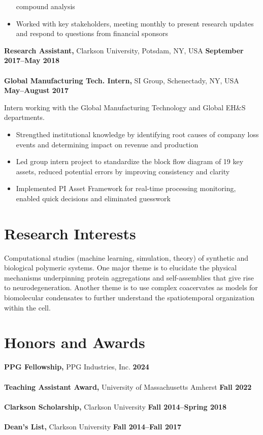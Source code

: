 \documentclass[margin,line]{res}
\begin{document}
\begin{resume}
\begin{adjustwidth}{1.5em}{0pt}
\begin{itemize}
			      compound analysis
			\item Worked with key stakeholders, meeting monthly to present
			      research updates and respond to questions from financial sponsors
		\end{itemize}
	\end{adjustwidth}
	{\bf Research Assistant,} Clarkson University, Potsdam, NY, USA
	\hfill {\bf September 2017--May 2018}\\
	\\
	{\bf Global Manufacturing Tech. Intern,} SI Group, Schenectady, NY, USA
	\hfill {\bf  May--August 2017}\\
	\begin{adjustwidth}{1.5em}{0pt}
		Intern working with the Global Manufacturing Technology and Global EH\&S
		departments.
		\begin{itemize}
			\item Strengthed institutional knowledge by identifying root causes of
			      company loss events and determining impact on revenue and production
			\item Led group intern project to standardize the block flow diagram of
			      19 key assets, reduced potential errors by improving consistency and
			      clarity
			\item Implemented PI Asset Framework for real-time processing monitoring,
			      enabled quick decisions and eliminated guesswork
		\end{itemize}
	\end{adjustwidth}
	\vspace{-1em}

	\section{\sc Research Interests}
	Computational studies (machine learning, simulation, theory) of synthetic and
	biological polymeric systems. One major theme is to elucidate the physical
	mechanisms underpinning protein aggregations and self-assemblies that give
	rise to neurodegeneration. Another theme is to use complex coacervates as
	models for biomolecular condensates to further understand the spatiotemporal
	organization within the cell.

	\section{\sc Honors and Awards}
	 {\bf PPG Fellowship,} PPG Industries, Inc. \hfill {\bf 2024}\\
	\\
	{\bf Teaching Assistant Award,} University of Massachusetts Amherst \hfill {\bf Fall 2022}\\
	\\
	{\bf Clarkson Scholarship,} Clarkson University \hfill {\bf Fall 2014--Spring 2018}\\
	\\
	{\bf Dean's List,} Clarkson University \hfill {\bf Fall 2014--Fall 2017}\\


\end{resume}
\end{document}
